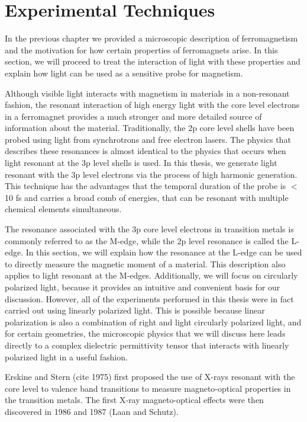 \chapter{Experimental Techniques}

In the previous chapter we provided a microscopic description of ferromagnetism and the motivation for how certain properties of ferromagnets arise. In this section, we will proceed to treat the interaction of light with these properties and explain how light can be used as a sensitive probe for magnetism. 

Although visible light interacts with magnetism in materials in a non-resonant fashion, the resonant interaction of high energy light with the core level electrons in a ferromagnet provides a much stronger and more detailed source of information about the material. Traditionally, the 2p core level shells have been probed using light from synchrotrons and free electron lasers. The physics that describes these resonances is almost identical to the physics that occurs when light resonant at the 3p level shells is used. In this thesis, we generate light resonant with the 3p level electrons via the process of high harmonic generation. This technique has the advantages that the temporal duration of the probe is $<$ 10 fs and carries a broad comb of energies, that can be resonant with multiple chemical elements simultaneous. 

The resonance associated with the 3p core level electrons in transition metals is commonly referred to as the M-edge, while the 2p level resonance is called the L-edge. In this section, we will explain how the resonance at the L-edge can be used to directly measure the magnetic moment of a material. This description also applies to light resonant at the M-edges. Additionally, we will focus on circularly polarized light, because it provides an intuitive and convenient basis for our discussion. However, all of the experiments performed in this thesis were in fact carried out using linearly polarized light. This is possible because linear polarization is also a combination of right and light circularly polarized light, and for certain geometries, the microscopic physics that we will discuss here leads directly to a complex dielectric permittivity tensor that interacts with linearly polarized light in a useful fashion.

Erskine and Stern (cite 1975) first proposed the use of X-rays resonant with the core level to valence band transitions to measure magneto-optical properties in the transition metals. The first X-ray magneto-optical effects were then discovered in 1986 and 1987 (Laan and Schutz).

